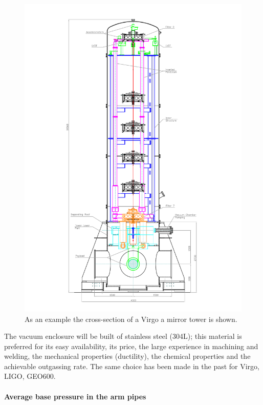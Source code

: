 \begin{figure}
\begin{center}
\includegraphics[width=\textwidth]{Sec_SiteInfra/Figures/VAC2.pdf}
\caption{As an example the cross-section of a Virgo a mirror tower is shown.}
\label{fig:vac2}
\end{center}
\end{figure}


The vacuum enclosure will be built of stainless steel (304L); this material is preferred for its easy availability, its price, the large experience in machining and welding, the mechanical properties (ductility), the chemical properties and the achievable outgassing rate. The same choice has been made in the past for Virgo, LIGO, GEO600.



\paragraph{Average base pressure in the arm pipes} \label{average_pressure}

